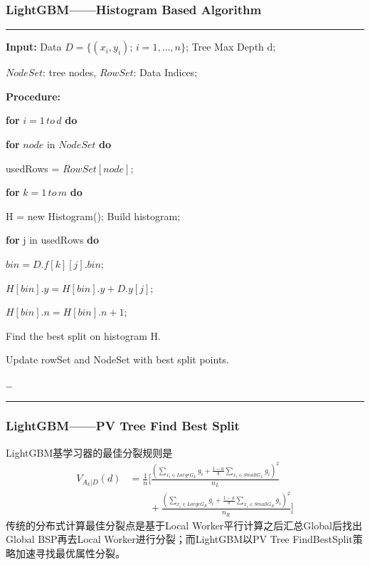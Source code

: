 \documentclass[usenames,dvipsnames]{beamer}
\begin{document}
\begin{frame}
\frametitle{LightGBM——Histogram Based Algorithm}
\noindent\rule[0.10\baselineskip]{\textwidth}{0.5pt}
  \textbf{Input:} Data $D=\{(x_i,y_i);\, i = 1,\dots, n\}$; Tree Max Depth d;\par
  \hspace*{32pt} $NodeSet$: tree nodes, $RowSet$: Data Indices;\par
  \textbf{Procedure:}\par
  \hspace*{32pt} \textbf{for} $i = 1\, to\, d$ \textbf{do}\par
  \hspace*{48pt} \textbf{for} $node$ in $NodeSet$ \textbf{do}\par
  \hspace*{64pt}  usedRows = $RowSet[node]$;\par
  \hspace*{64pt}  \textbf{for} $k = 1\,to\,m$ \textbf{do}\par
  \hspace*{80pt}  H = new Histogram(); Build histogram;\par
  \hspace*{80pt}  \textbf{for} j in usedRows \textbf{do}\par
  \hspace*{96pt}  $bin = D.f[k][j].bin$;\par
  \hspace*{96pt}  $H[bin].y = H[bin].y + D.y[j]$;\par
  \hspace*{96pt}  $H[bin].n = H[bin].n + 1$;\par
  \hspace*{80pt}  Find the best split on histogram H.\par
  \hspace*{48pt}  Update rowSet and NodeSet with best split points.\par 
  \hspace*{48pt}  \dots\par 
\noindent\rule[0.10\baselineskip]{\textwidth}{0.75pt}\par
\end{frame}
\begin{frame}
\frametitle{LightGBM——PV Tree Find Best Split}
LightGBM基学习器的最佳分裂规则是
\begin{align*}
V_{A_k|D}(d) & = \frac{1}{n}[\frac{(\sum_{x_i \in LargeG_L}g_i + \frac{1-a}{b}\sum_{x_i \in SmallG_L}g_i)^2}{n_L}\\
             &\qquad+\frac{(\sum_{x_i \in LargeG_R}g_i + \frac{1-a}{b}\sum_{x_i \in SmallG_R}g_i)^2}{n_R}]
\end{align*}
传统的分布式计算最佳分裂点是基于Local Worker平行计算之后汇总Global后找出Global BSP再去Local Worker进行分裂；而LightGBM以PV Tree FindBestSplit策略加速寻找最优属性分裂。
\end{frame}
\end{document}
